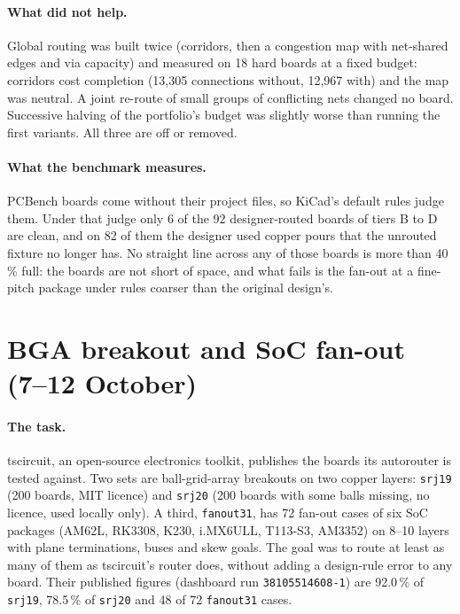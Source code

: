\documentclass[10pt,a4paper]{article}
\begin{document}
\paragraph{What did not help.} Global routing was built twice (corridors, then a congestion map with net-shared
edges and via capacity) and measured on 18 hard boards at a fixed budget: corridors cost completion (13,305
connections without, 12,967 with) and the map was neutral. A joint re-route of small groups of conflicting nets
changed no board. Successive halving of the portfolio's budget was slightly worse than running the first variants.
All three are off or removed.

\paragraph{What the benchmark measures.} PCBench boards come without their project files, so KiCad's default rules
judge them. Under that judge only 6 of the 92 designer-routed boards of tiers B to D are clean, and on 82 of them
the designer used copper pours that the unrouted fixture no longer has. No straight line across any of those boards
is more than 40\,\% full: the boards are not short of space, and what fails is the fan-out at a fine-pitch package
under rules coarser than the original design's.

\section{BGA breakout and SoC fan-out (7--12 October)}
\label{sec:m14}

\paragraph{The task.} tscircuit, an open-source electronics toolkit, publishes the boards its autorouter is tested
against. Two sets are ball-grid-array breakouts on two copper layers: \texttt{srj19} (200 boards, MIT licence) and
\texttt{srj20} (200 boards with some balls missing, no licence, used locally only). A third, \texttt{fanout31}, has 72
fan-out cases of six SoC packages (AM62L, RK3308, K230, i.MX6ULL, T113-S3, AM3352) on 8--10 layers with plane
terminations, buses and skew goals. The goal was to route at least as many of them as tscircuit's router does,
without adding a design-rule error to any board. Their published figures (dashboard run \texttt{38105514608-1}) are
92.0\,\% of \texttt{srj19}, 78.5\,\% of \texttt{srj20} and 48 of 72 \texttt{fanout31} cases.
\end{document}
